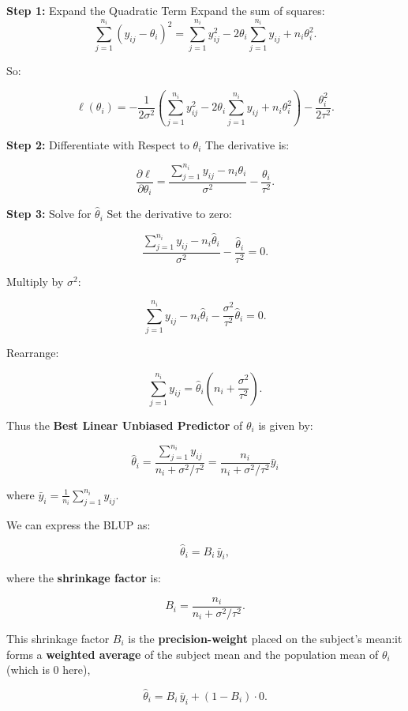\documentclass[
  letterpaper,
  DIV=11,
  numbers=noendperiod]{scrreprt}
\begin{document}
\textbf{Step 1:} Expand the Quadratic Term Expand the sum of squares: \[
\sum_{j=1}^{n_i} (y_{ij} - \theta_i)^2
= \sum_{j=1}^{n_i} y_{ij}^2 - 2 \theta_i \sum_{j=1}^{n_i} y_{ij} + n_i \theta_i^2.
\]

So:

\[
\ell(\theta_i) 
= -\frac{1}{2\sigma^2} 
\left( \sum_{j=1}^{n_i} y_{ij}^2 - 2 \theta_i \sum_{j=1}^{n_i} y_{ij} + n_i \theta_i^2 \right)
- \frac{\theta_i^2}{2 \tau^2}.
\]

\textbf{Step 2:} Differentiate with Respect to \(\theta_i\) The
derivative is:

\[
\frac{\partial \ell}{\partial \theta_i}
= \frac{\sum_{j=1}^{n_i} y_{ij} - n_i \theta_i}{\sigma^2} - \frac{\theta_i}{\tau^2}.
\]

\textbf{Step 3:} Solve for \(\hat{\theta}_i\) Set the derivative to
zero:

\[
\frac{\sum_{j=1}^{n_i} y_{ij} - n_i \hat{\theta}_i}{\sigma^2} - \frac{\hat{\theta}_i}{\tau^2} = 0.
\]

Multiply by \(\sigma^2\):

\[
\sum_{j=1}^{n_i} y_{ij} - n_i \hat{\theta}_i - \frac{\sigma^2}{\tau^2} \hat{\theta}_i = 0.
\]

Rearrange:

\[
\sum_{j=1}^{n_i} y_{ij} = \hat{\theta}_i \left( n_i + \frac{\sigma^2}{\tau^2} \right).
\]

\begin{tcolorbox}[enhanced jigsaw, rightrule=.15mm, breakable, left=2mm, colframe=quarto-callout-note-color-frame, opacityback=0, leftrule=.75mm, toprule=.15mm, colback=white, arc=.35mm, bottomrule=.15mm]

Thus the \textbf{Best Linear Unbiased Predictor} of \(\theta_i\) is
given by:

\[
\hat{\theta}_i = \frac{\sum_{j=1}^{n_i} y_{ij}}{n_i + \sigma^2 / \tau^2} = \frac{n_i}{n_i + \sigma^2 / \tau^2} \bar{y}_i
\]

where \(\bar{y}_i = \frac{1}{n_i} \sum_{j=1}^{n_i} y_{ij}\).

We can express the BLUP as:

\[
\hat{\theta}_i = B_i \, \bar{y}_i,
\]

where the \textbf{shrinkage factor} is:

\[
B_i = \frac{n_i}{n_i + \sigma^2/\tau^2}.
\]

This shrinkage factor \(B_i\) is the \textbf{precision-weight} placed on
the subject's mean:it forms a \textbf{weighted average} of the subject
mean and the population mean of \(\theta_i\) (which is 0 here),

\[
\hat{\theta}_i = B_i\,\bar{y}_i + (1-B_i)\cdot 0.
\]

\end{tcolorbox}
\end{document}

